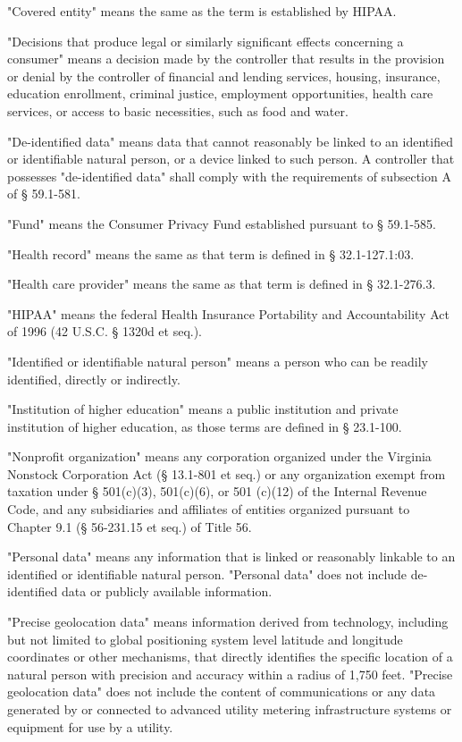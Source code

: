 "Covered entity" means the same as the term is established by HIPAA.

"Decisions that produce legal or similarly significant effects concerning a consumer" means a decision made by the controller that results in the provision or denial by the controller of financial and lending services, housing, insurance, education enrollment, criminal justice, employment opportunities, health care services, or access to basic necessities, such as food and water.

"De-identified data" means data that cannot reasonably be linked to an identified or identifiable natural person, or a device linked to such person. A controller that possesses "de-identified data" shall comply with the requirements of subsection A of § 59.1-581.

"Fund" means the Consumer Privacy Fund established pursuant to § 59.1-585.

"Health record" means the same as that term is defined in § 32.1-127.1:03.

"Health care provider" means the same as that term is defined in § 32.1-276.3.

"HIPAA" means the federal Health Insurance Portability and Accountability Act of 1996 (42 U.S.C. § 1320d et seq.).

"Identified or identifiable natural person" means a person who can be readily identified, directly or indirectly.

"Institution of higher education" means a public institution and private institution of higher education, as those terms are defined in § 23.1-100.

"Nonprofit organization" means any corporation organized under the Virginia Nonstock Corporation Act (§ 13.1-801 et seq.) or any organization exempt from taxation under § 501(c)(3), 501(c)(6), or 501 (c)(12) of the Internal Revenue Code, and any subsidiaries and affiliates of entities organized pursuant to Chapter 9.1 (§ 56-231.15 et seq.) of Title 56.

"Personal data" means any information that is linked or reasonably linkable to an identified or identifiable natural person. "Personal data" does not include de-identified data or publicly available information.

"Precise geolocation data" means information derived from technology, including but not limited to global positioning system level latitude and longitude coordinates or other mechanisms, that directly identifies the specific location of a natural person with precision and accuracy within a radius of 1,750 feet. "Precise geolocation data" does not include the content of communications or any data generated by or connected to advanced utility metering infrastructure systems or equipment for use by a utility.

